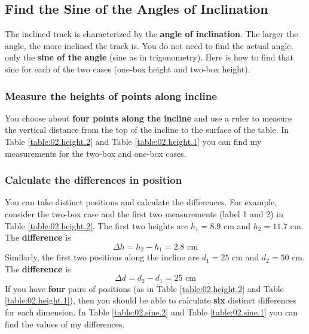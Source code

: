 \subsection{Find the Sine of the Angles of Inclination}
The inclined track is characterized by the \textbf{angle of inclination}. The larger the angle, the more inclined the track is. You do not need to find the actual angle, only the \textbf{sine of the angle} (sine as in trigonometry). Here is how to find that sine for each of the two cases (one-box height and two-box height).
\subsubsection{Measure the heights of points along incline}
You choose about \textbf{four points along the incline} and use a ruler to measure the vertical distance from the top of the incline to the surface of the table. In Table \ref{table:02.height.2} and Table \ref{table:02.height.1} you can find my measurements for the two-box and one-box cases.
\subsubsection{Calculate the differences in position}
You can take distinct positions and calculate the differences. For example, consider the two-box case and the first two measurements (label 1 and 2) in Table \ref{table:02.height.2}. The first two heights are $h_{1} = 8.9$ cm and $h_{2} = 11.7$ cm. The \textbf{difference} is
\begin{equation}
    \Delta h = h_{2} - h_{1} = 2.8 \text{ cm}
\end{equation}
Similarly, the first two positions along the incline are $d_{1} = 25$ cm and $d_{2} = 50$ cm. The \textbf{difference} is
\begin{equation}
    \Delta d = d_{2} - d_{1} = 25 \text{ cm}
\end{equation}
If you have \textbf{four} pairs of positions (as in Table \ref{table:02.height.2} and Table \ref{table:02.height.1}), then you should be able to calculate \textbf{six} distinct differences for each dimension. In Table \ref{table:02.sine.2} and Table \ref{table:02.sine.1} you can find the values of my differences.

